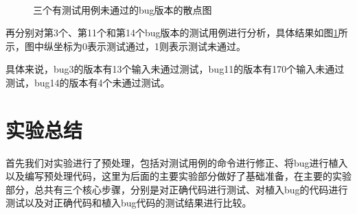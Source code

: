 \documentclass[12pt, a4paper, oneside,bibend=bibtex]{ctexart}
\begin{document}
\begin{figure}[htbp]
	\centering  %
	\subfigbottomskip=2pt %
	\subfigcapskip=-5pt %
	  \\
    \caption{三个有测试用例未通过的bug版本的散点图}
    \label{bugs}
\end{figure}

再分别对第3个、第11个和第14个bug版本的测试用例进行分析，具体结果如图\ref{bugs}所示，图中纵坐标为0表示测试通过，1则表示测试未通过。

具体来说，bug3的版本有13个输入未通过测试，bug11的版本有170个输入未通过测试，bug14的版本有4个未通过测试。


\section{实验总结}
首先我们对实验进行了预处理，包括对测试用例的命令进行修正、将bug进行植入以及编写预处理代码，这里为后面的主要实验部分做好了基础准备，在主要的实验部分，总共有三个核心步骤，分别是对正确代码进行测试、对植入bug的代码进行测试以及对正确代码和植入bug代码的测试结果进行比较。
\end{document}
